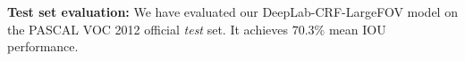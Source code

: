 



\textbf{Test set evaluation:} We have evaluated our DeepLab-CRF-LargeFOV model
on the PASCAL VOC 2012 official \textit{test} set. It achieves $70.3\%$ mean IOU
performance.



